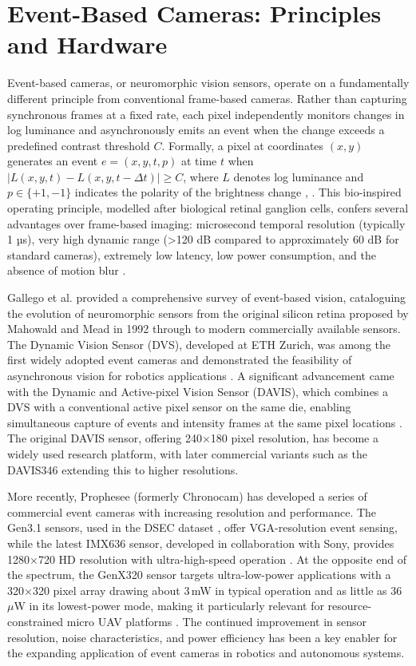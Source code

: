 \documentclass[11pt, a4paper]{report}
\begin{document}
\section{Event-Based Cameras: Principles and Hardware}
Event-based cameras, or neuromorphic vision sensors, operate on a fundamentally different principle from conventional frame-based cameras. Rather than capturing synchronous frames at a fixed rate, each pixel independently monitors changes in log luminance and asynchronously emits an event when the change exceeds a predefined contrast threshold $C$. Formally, a pixel at coordinates $(x, y)$ generates an event $e = (x, y, t, p)$ at time $t$ when $|L(x, y, t) - L(x, y, t - \Delta t)| \geq C$, where $L$ denotes log luminance and $p \in \{+1, -1\}$ indicates the polarity of the brightness change \cite{gallego2020event}, \cite{lichtsteiner2008128x128}. This bio-inspired operating principle, modelled after biological retinal ganglion cells, confers several advantages over frame-based imaging: microsecond temporal resolution (typically 1 µs), very high dynamic range (>120 dB compared to approximately 60 dB for standard cameras), extremely low latency, low power consumption, and the absence of motion blur \cite{gallego2020event}.

Gallego et al. \cite{gallego2020event} provided a comprehensive survey of event-based vision, cataloguing the evolution of neuromorphic sensors from the original silicon retina proposed by Mahowald and Mead in 1992 through to modern commercially available sensors. The Dynamic Vision Sensor (DVS), developed at ETH Zurich, was among the first widely adopted event cameras and demonstrated the feasibility of asynchronous vision for robotics applications \cite{lichtsteiner2008128x128}. A significant advancement came with the Dynamic and Active-pixel Vision Sensor (DAVIS), which combines a DVS with a conventional active pixel sensor on the same die, enabling simultaneous capture of events and intensity frames at the same pixel locations \cite{brandli2014240x180}. The original DAVIS sensor, offering 240×180 pixel resolution, has become a widely used research platform, with later commercial variants such as the DAVIS346 extending this to higher resolutions. 

More recently, Prophesee (formerly Chronocam) has developed a series of commercial event cameras with increasing resolution and performance. The Gen3.1 sensors, used in the DSEC dataset \cite{gehrig2021dsec}, offer VGA-resolution event sensing, while the latest IMX636 sensor, developed in collaboration with Sony, provides 1280×720 HD resolution with ultra-high-speed operation \cite{prophesee2026metavision}. At the opposite end of the spectrum, the GenX320 sensor targets ultra-low-power applications with a 320×320 pixel array drawing about 3\,mW in typical operation and as little as 36\,$\mu$W in its lowest-power mode, making it particularly relevant for resource-constrained micro UAV platforms \cite{prophesee2025genx320}. The continued improvement in sensor resolution, noise characteristics, and power efficiency has been a key enabler for the expanding application of event cameras in robotics and autonomous systems. 
\end{document}
